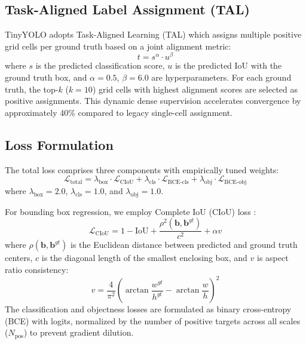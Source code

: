 \documentclass[article,submit,moreauthors,pdftex,10pt,a4paper]{article}
\begin{document}
\subsection{Task-Aligned Label Assignment (TAL)}
TinyYOLO adopts Task-Aligned Learning (TAL) \cite{feng2021tood} which assigns multiple positive grid cells per ground truth based on a joint alignment metric:
\begin{equation}
t = s^\alpha \cdot u^\beta
\end{equation}
where $s$ is the predicted classification score, $u$ is the predicted IoU with the ground truth box, and $\alpha = 0.5$, $\beta = 6.0$ are hyperparameters. For each ground truth, the top-$k$ ($k = 10$) grid cells with highest alignment scores are selected as positive assignments. This dynamic dense supervision accelerates convergence by approximately 40\% compared to legacy single-cell assignment.

\subsection{Loss Formulation}
The total loss comprises three components with empirically tuned weights:
\begin{equation}
\mathcal{L}_{\text{total}} = \lambda_{\text{box}} \cdot \mathcal{L}_{\text{CIoU}} + \lambda_{\text{cls}} \cdot \mathcal{L}_{\text{BCE-cls}} + \lambda_{\text{obj}} \cdot \mathcal{L}_{\text{BCE-obj}}
\end{equation}
where $\lambda_{\text{box}} = 2.0$, $\lambda_{\text{cls}} = 1.0$, and $\lambda_{\text{obj}} = 1.0$.

For bounding box regression, we employ Complete IoU (CIoU) loss \cite{zheng2020distance}:
\begin{equation}
\mathcal{L}_{\text{CIoU}} = 1 - \text{IoU} + \frac{\rho^2(\mathbf{b}, \mathbf{b}^{gt})}{c^2} + \alpha v
\end{equation}
where $\rho(\mathbf{b}, \mathbf{b}^{gt})$ is the Euclidean distance between predicted and ground truth centers, $c$ is the diagonal length of the smallest enclosing box, and $v$ is aspect ratio consistency:
\begin{equation}
v = \frac{4}{\pi^2}\left(\arctan\frac{w^{gt}}{h^{gt}} - \arctan\frac{w}{h}\right)^2
\end{equation}
The classification and objectness losses are formulated as binary cross-entropy (BCE) with logits, normalized by the number of positive targets across all scales ($N_{\text{pos}}$) to prevent gradient dilution.
\end{document}
